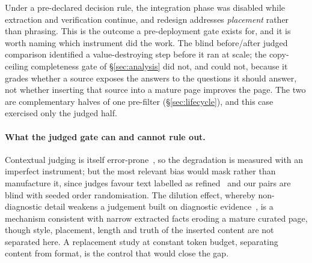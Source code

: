 \documentclass[10pt,twocolumn]{article}
\begin{document}
Under a pre-declared decision rule, the integration phase was disabled while extraction and
verification continue, and redesign addresses \emph{placement} rather than phrasing. This is the outcome a pre-deployment gate exists for, and it is worth naming which instrument did
the work. The blind before/after judged comparison identified a value-destroying step before it ran at
scale; the copy-ceiling completeness gate of \S\ref{sec:analysis} did not, and could not, because it
grades whether a source exposes the answers to the questions it should answer, not whether inserting
that source into a mature page improves the page. The two are complementary halves of one pre-filter (\S\ref{sec:lifecycle}), and this case exercised
only the judged half.

\paragraph{What the judged gate can and cannot rule out.} Contextual judging is itself error-prone~\cite{contextualjudgebench2025}, so the degradation is measured with an imperfect instrument; but the most relevant bias would mask rather than manufacture it, since judges favour text labelled as refined~\cite{calmjudgebias2024} and our pairs are blind with seeded order randomisation. The dilution effect, whereby non-diagnostic detail weakens a judgement built on diagnostic evidence~\cite{nisbett1981dilution}, is a mechanism consistent with narrow extracted facts eroding a mature curated page, though style, placement, length and truth of the inserted content are not separated here. A replacement study at constant token budget, separating content from format, is the control that would close the gap.
\end{document}

